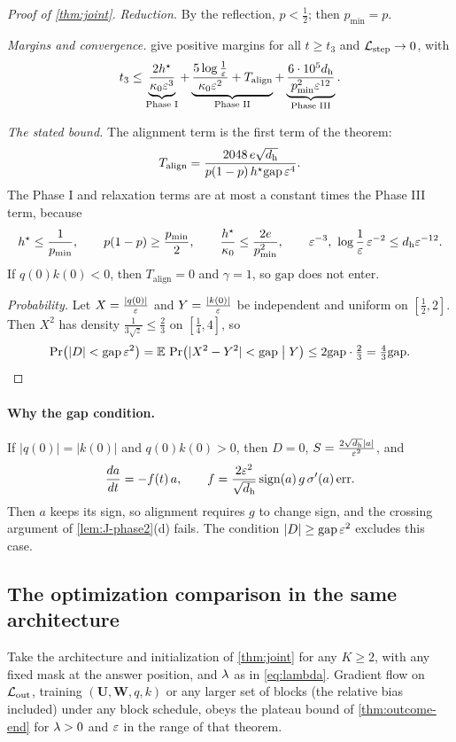 \begin{proof}[Proof of \cref{thm:joint}]
\emph{Reduction.} By the reflection, $p<\frac{1}{2}$; then $p_{\min}=p$.

\emph{Margins and convergence.}  give positive margins for all $t\ge t_3$ and $\mathcal L_{\mathrm{step}}\to0$, with
\[
 t_3\le\underbrace{\frac{2h^\star}{\kappa_0\varepsilon^3}}_{\text{Phase I}}+\underbrace{\frac{5\log\frac{1}{\varepsilon}}{\kappa_0\varepsilon^2}+T_{\mathrm{align}}}_{\text{Phase II}}
 +\underbrace{\frac{6\cdot10^5d_{\mathrm h}}{p_{\min}^2\varepsilon^{12}}}_{\text{Phase III}} .
\]

\emph{The stated bound.} The alignment term is the first term of the theorem:
\[
 T_{\mathrm{align}}=\frac{2048\,e\sqrt{d_{\mathrm h}}}{p(1-p)\,h^\star\mathrm{gap}\,\varepsilon^4}.
\]
The Phase I and relaxation terms are at most a constant times the Phase III term, because
\[
 h^\star\le\frac{1}{p_{\min}},\qquad p(1-p)\ge\frac{p_{\min}}{2},\qquad \frac{h^\star}{\kappa_0}\le\frac{2e}{p_{\min}^2},\qquad
 \varepsilon^{-3},\ \log\frac{1}{\varepsilon}\,\varepsilon^{-2}\le d_{\mathrm h}\varepsilon^{-12} .
\]
If $q(0)k(0)<0$, then $T_{\mathrm{align}}=0$ and $\gamma=1$, so $\mathrm{gap}$ does not enter.

\emph{Probability.} Let $X=\frac{|q(0)|}{\varepsilon}$ and $Y=\frac{|k(0)|}{\varepsilon}$ be independent and uniform on $[\frac{1}{2},2]$. Then $X^2$ has density
$\frac{1}{3\sqrt z}\le\frac{2}{3}$ on $[\frac{1}{4},4]$, so
\[
 \Pr\bigl(|D|<\mathrm{gap}\,\varepsilon^2\bigr)=\mathbb E\,\Pr\bigl(|X^2-Y^2|<\mathrm{gap}\bigm|Y\bigr)\le2\mathrm{gap}\cdot\tfrac{2}{3}=\tfrac{4}{3}\mathrm{gap} .
\]
\end{proof}

\paragraph{Why the gap condition.}\label{rem:J-balance} If $|q(0)|=|k(0)|$ and $q(0)k(0)>0$, then $D=0$, $S=\frac{2\sqrt{d_{\mathrm h}}|a|}{\varepsilon^2}$, and
\[
 \ddt{a}=-f(t)\,a,\qquad f=\frac{2\initscale^2}{\sqrt{d_{\mathrm h}}}\operatorname{sign}(a)\,g\,\sigma'(a)\,\mathrm{err} .
\]
Then $a$ keeps its sign, so alignment requires $g$ to change sign, and the crossing argument of \cref{lem:J-phase2}(d) fails. The condition $|D|\ge\mathrm{gap}\,\varepsilon^2$ excludes this case.



\subsection{The optimization comparison in the same architecture}
\begin{corollary}
\label{cor:joint-outcome}
Take the architecture and initialization of \cref{thm:joint} for any $K\ge2$, with any fixed mask at the answer position, and $\lambda$ as in
\cref{eq:lambda}. Gradient flow on $\mathcal L_{\mathrm{out}}$, training $(\mathbf U,\mathbf W,q,k)$ or any larger set of blocks (the relative bias included) under any block
schedule, obeys the plateau bound of \cref{thm:outcome-end} for $\lambda>0$ and $\varepsilon$ in the range of that theorem.
\end{corollary}

